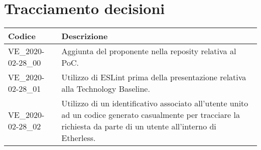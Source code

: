 \section{Tracciamento decisioni}
\renewcommand{\arraystretch}{1.8}

\begin{longtable}{|p{5cm}|p{8cm}|}
	\hline
	
	\rowcolor{header}
	\textbf{Codice} & \textbf{Descrizione} \\
	
	\hline
	
	VE\_2020-02-28\_00 & Aggiunta del proponente nella reposity relativa al PoC.\\
	VE\_2020-02-28\_01 & Utilizzo di ESLint prima della presentazione relativa alla Technology Baseline. \\
	VE\_2020-02-28\_02 & Utilizzo di un identificativo associato all'utente unito ad un codice generato casualmente per tracciare la richiesta da parte di un utente all'interno di Etherless. \\
	
	\hline
\end{longtable}